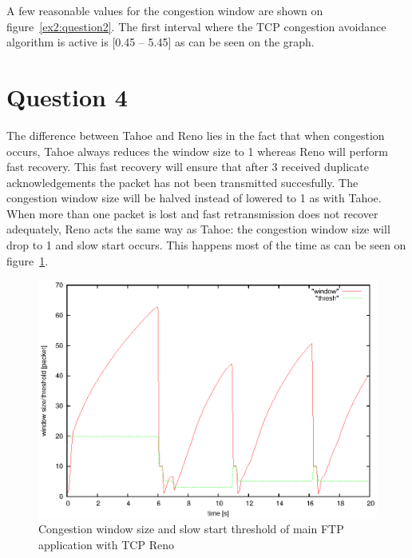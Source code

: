\documentclass[a4paper]{report}
\begin{document}
A few reasonable values for the congestion window are shown on figure~\ref{ex2:question2}.
The first interval where the TCP congestion avoidance algorithm is active is [0.45 – 5.45] as can be seen on the graph.

\section*{Question 4}
The difference between Tahoe and Reno lies in the fact that when congestion occurs, Tahoe always reduces the window size to 1 whereas Reno will perform fast recovery. This fast recovery will ensure that after 3 received duplicate acknowledgements the packet has not been transmitted succesfully. The congestion window size will be halved instead of lowered to 1 as with Tahoe. When more than one packet is lost and fast retransmission does not recover adequately, Reno acts the same way as Tahoe: the congestion window size will drop to 1 and slow start occurs. This happens most of the time as can be seen on figure~\ref{ex2:question4}.
\begin{figure}[h]
\centerline{\includegraphics{pictures/E2Q4.eps}}
\caption{Congestion window size and slow start threshold of main FTP application with TCP Reno}
\label{ex2:question4}
\end{figure}
\end{document}
